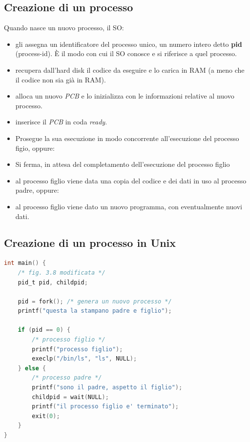 \subsection{Creazione di un processo}
Quando nasce un nuovo processo, il SO:
\begin{itemize}
    \item gli assegna un identificatore del processo unico, un numero intero detto \textbf{pid} (process-id). È il modo con cui il SO conosce e si riferisce a quel processo.
    \item recupera dall’hard disk il codice da eseguire e lo carica in RAM (a meno che il codice non sia già in RAM).
    \item alloca un nuovo \textit{PCB} e lo inizializza con le informazioni relative al nuovo processo.
    \item inserisce il \textit{PCB} in coda \textit{ready}.
\end{itemize}

\begin{itemize}
    \item Prosegue la sua esecuzione in modo concorrente all'esecuzione del processo figio, oppure:
    \item  Si ferma, in attesa del completamento dell'esecuzione del processo figlio
\end{itemize}
\begin{itemize}
    \item al processo figlio viene data una copia del codice e dei dati in uso al processo padre, oppure:
    \item al processo figlio viene dato un nuovo programma, con eventualmente nuovi dati.
\end{itemize}

\subsection{Creazione di un processo in Unix}
\begin{lstlisting}[language=C]
int main() {
    /* fig. 3.8 modificata */
    pid_t pid, childpid;
    
    pid = fork(); /* genera un nuovo processo */
    printf("questa la stampano padre e figlio");
    
    if (pid == 0) { 
        /* processo figlio */
        printf("processo figlio");
        execlp("/bin/ls", "ls", NULL);
    } else {
        /* processo padre */
        printf("sono il padre, aspetto il figlio");
        childpid = wait(NULL);
        printf("il processo figlio e' terminato");
        exit(0);
    }
}
\end{lstlisting}

